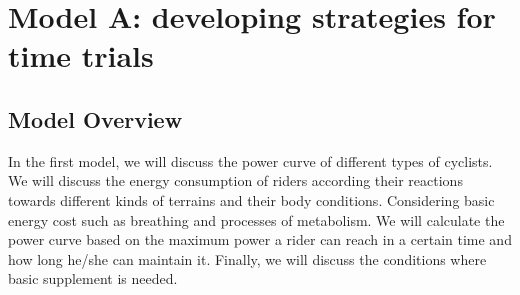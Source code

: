 \documentclass{article}
\begin{document}
	\section{Model A: developing strategies for time trials}
		\subsection{Model Overview}
			In the first model, we will discuss the power curve of different types of cyclists. We will discuss the energy consumption of riders according their reactions towards different kinds of terrains and their body conditions. Considering basic energy cost such as breathing and processes of metabolism. We will calculate the power curve based on the maximum power a rider can reach in a certain time and how long he/she can maintain it. Finally, we will discuss the conditions where basic supplement is needed.
\end{document}
